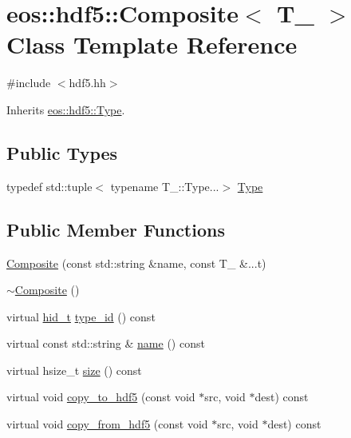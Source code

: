 \hypertarget{classeos_1_1hdf5_1_1Composite}{
\section{eos::hdf5::Composite$<$ T\_\- $>$ Class Template Reference}
\label{classeos_1_1hdf5_1_1Composite}
}


{\ttfamily \#include $<$hdf5.hh$>$}

Inherits \hyperlink{structeos_1_1hdf5_1_1Type}{eos::hdf5::Type}.\subsection*{Public Types}
\begin{DoxyCompactItemize}
\item 
typedef std::tuple$<$ typename T\_\-::Type...$>$ \hyperlink{classeos_1_1hdf5_1_1Composite_ada7dfe0d889983cbb27abbaffdeb1220}{Type}
\end{DoxyCompactItemize}
\subsection*{Public Member Functions}
\begin{DoxyCompactItemize}
\item 
\hyperlink{classeos_1_1hdf5_1_1Composite_a191269a71c496e5ec3b4514400cfe6f4}{Composite} (const std::string \&name, const T\_\- \&...t)
\item 
\hyperlink{classeos_1_1hdf5_1_1Composite_af9412e3240e5916899327e756407057f}{$\sim$Composite} ()
\item 
virtual \hyperlink{namespaceeos_1_1hdf5_a5bd5e209f1bf36cdc5551465dacf2e74}{hid\_\-t} \hyperlink{classeos_1_1hdf5_1_1Composite_a97743d3126f849b6359587508b488a38}{type\_\-id} () const 
\item 
virtual const std::string \& \hyperlink{classeos_1_1hdf5_1_1Composite_aa72cd90613270fa5006319bee231be5b}{name} () const 
\item 
virtual hsize\_\-t \hyperlink{classeos_1_1hdf5_1_1Composite_a67ce4870971aced7cf83a7a88c16c61d}{size} () const 
\item 
virtual void \hyperlink{classeos_1_1hdf5_1_1Composite_ac86859046bcb7b5741afdb5ec13e78f0}{copy\_\-to\_\-hdf5} (const void $\ast$src, void $\ast$dest) const 
\item 
virtual void \hyperlink{classeos_1_1hdf5_1_1Composite_a4504f18af7ad323f89b4635eae9f1695}{copy\_\-from\_\-hdf5} (const void $\ast$src, void $\ast$dest) const 
\end{DoxyCompactItemize}
